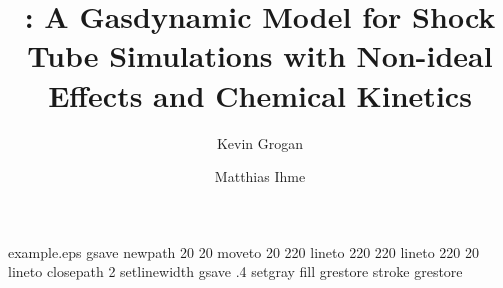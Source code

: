 %
%
%
%
%
\begin{filecontents*}{example.eps}
gsave
newpath
  20 20 moveto
  20 220 lineto
  220 220 lineto
  220 20 lineto
closepath
2 setlinewidth
gsave
  .4 setgray fill
grestore
stroke
grestore
\end{filecontents*}
%
\RequirePackage{fix-cm}
%
\documentclass{svjour3}                     %
%
\smartqed  %

%

\usepackage{setspace}
\usepackage{graphicx}
\graphicspath{{../Figures/}}
\usepackage{epsfig}
\usepackage{color}
\usepackage{psfrag}

\usepackage{subfigmat}
\usepackage{subeqnarray}
\usepackage[colorlinks]{hyperref}
\usepackage{amsmath,amsfonts,amsfonts}
\usepackage{xcolor,colortbl}
\usepackage[mathscr]{euscript}
\usepackage{algorithm2e}
\usepackage{siunitx}
\usepackage{rotating}
\usepackage{bm,bbm}
\setcounter{secnumdepth}{3}
\usepackage[version=3]{mhchem}   %
\usepackage[numbers]{natbib}
\usepackage{optidef}
\usepackage[T1]{fontenc}




\title{\textbf{\stnshk}: A Gasdynamic Model for Shock Tube Simulations with Non-ideal Effects and Chemical Kinetics}
\titlerunning{\stnshk}
\author{Kevin Grogan         \and
        Matthias Ihme
}


